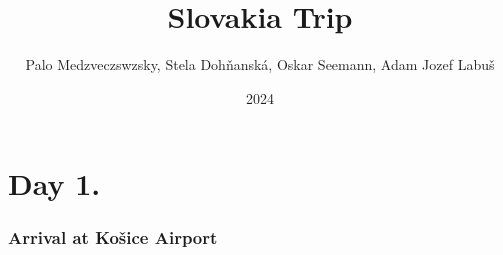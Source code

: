 \documentclass{beamer}
\title{Slovakia Trip}
\author{Palo Medzveczswzsky, Stela Dohňanská, Oskar Seemann, Adam Jozef Labuš}
\date{2024}
\begin{document}
	\section{Day 1.}
	\begin{frame}
		\frametitle{Arrival at Košice Airport}



\end{frame}
\end{document}
